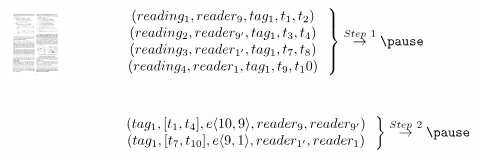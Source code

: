 \begin{frame}
\begin{columns}[c]
\vspace{-15pt}
\begin{figure}[tb]
  \includegraphics[width=\columnwidth]{figures/2-1/2-1-12.pdf}
\end{figure}
\tiny{
  \pause
  $\left.\begin{matrix}
  (reading_1, reader_{9}, tag_1, t_1, t_2)~~\\
  (reading_2, reader_{9'}, tag_1, t_3, t_4)~~\\
  (reading_3, reader_{1'}, tag_1, t_7, t_8)~~\\
  (reading_4, reader_{1}, tag_1, t_9, t_10)~~
  \end{matrix}\right\} \overset{Step~1}{\rightarrow} \pause$ \\~\\~\\

  $\left.\begin{matrix}
  (tag_1, [t_1,t_4], e\langle 10,9 \rangle, reader_{9}, reader_{9'})~~\\
  (tag_1, [t_7,t_{10}], e\langle 9,1 \rangle, reader_{1'}, reader_{1})~~
  \end{matrix}\right\} \overset{Step~2}{\rightarrow} \pause$ \\~\\~\\

}
\end{columns}
\end{frame}
